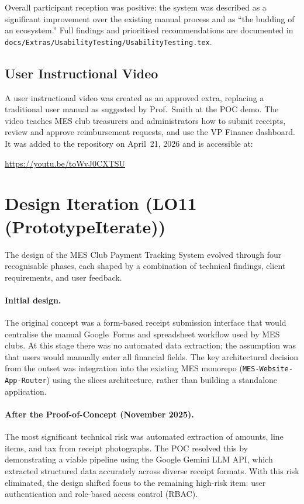 \documentclass{article}
\begin{document}
Overall participant reception was positive: the system was described as a
significant improvement over the existing manual process and as ``the
budding of an ecosystem.''  Full findings and prioritised recommendations
are documented in
\texttt{docs/Extras/UsabilityTesting/UsabilityTesting.tex}.

\subsection{User Instructional Video}

A user instructional video was created as an approved extra, replacing a
traditional user manual as suggested by Prof.\ Smith at the POC demo.  The
video teaches MES club treasurers and administrators how to submit receipts,
review and approve reimbursement requests, and use the VP Finance dashboard.
It was added to the repository on April~21, 2026 and is accessible at:

\begin{center}
\url{https://youtu.be/toWvJ0CXTSU}
\end{center}

\section{Design Iteration (LO11 (PrototypeIterate))}

The design of the MES Club Payment Tracking System evolved through four
recognisable phases, each shaped by a combination of technical findings,
client requirements, and user feedback.

\paragraph{Initial design.}
The original concept was a form-based receipt submission interface that
would centralise the manual Google~Forms and spreadsheet workflow used by
MES clubs.  At this stage there was no automated data extraction; the
assumption was that users would manually enter all financial fields.  The
key architectural decision from the outset was integration into the existing
MES monorepo (\texttt{MES-Website-App-Router}) using the slices
architecture, rather than building a standalone application.

\paragraph{After the Proof-of-Concept (November 2025).}
The most significant technical risk was automated extraction of amounts,
line items, and tax from receipt photographs.  The POC resolved this by
demonstrating a viable pipeline using the Google Gemini LLM API, which
extracted structured data accurately across diverse receipt formats.  With
this risk eliminated, the design shifted focus to the remaining high-risk
item: user authentication and role-based access control (RBAC).
\end{document}
